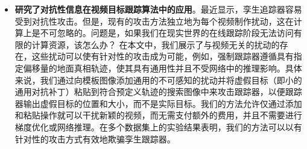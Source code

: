 \begin{itemize}
\item \textbf{研究了对抗性信息在视频目标跟踪算法中的应用}。最近显示，孪生追踪器容易受到对抗性攻击。但是，现有的攻击方法独立地为每个视频制作扰动，这在计算上是不可忽略的。问题是，如果我们在现实世界的在线跟踪阶段无法访问有限的计算资源，该怎么办？
在本文中，我们展示了与视频无关的扰动的存在，这些扰动可以使有针对性的攻击成为可能，例如，强制跟踪器遵循具有指定偏移量的地面真相轨迹，使其具有通用性并且不受网络中的推理影响。具体来说，我们通过向模板图像添加通用的不可感知的扰动并将虚假目标（即小的通用对抗补丁）粘贴到符合预定义轨迹的搜索图像中来攻击跟踪器，以便跟踪器输出虚假目标的位置和大小，而不是实际目标。我们的方法允许仅通过添加和粘贴操作就可以干扰新颖的视频，而无需支付额外的费用，并且不需要进行梯度优化或网络推理。在多个数据集上的实验结果表明，我们的方法可以以有针对性的攻击方式有效地欺骗孪生跟踪器。
\end{itemize}

